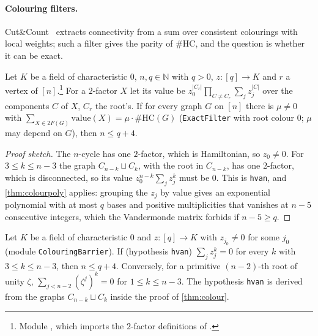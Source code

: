 \documentclass[10pt]{amsart}
\theoremstyle{plain}
\theoremstyle{definition}
\theoremstyle{remark}
\numberwithin{equation}{section}
\newcommand{\N}{\mathbb{N}}
\begin{document}
\paragraph{Colouring filters.} Cut\&Count~\cite{CutAndCount11} extracts connectivity from a sum over
consistent colourings with local weights; such a filter gives the parity of $\#$HC, and the question
is whether it can be exact.

\begin{theorem}\label{thm:colour}
Let $K$ be a field of characteristic $0$, $n,q\in\N$ with $q>0$, $z:[q]\to K$ and $r$ a vertex of
$[n]$.\footnote{Module , which imports the
$2$-factor definitions of .} For a $2$-factor $X$ let its value be
$z_0^{|C_r|}\prod_{C\ne C_r}\sum_jz_j^{|C|}$ over the components $C$ of $X$, $C_r$ the root's. If for
every graph $G$ on $[n]$ there is $\mu\ne0$ with $\sum_{X\in2F(G)}\mathrm{value}(X)=\mu\cdot\#\mathrm{HC}(G)$
(\texttt{ExactFilter} with root colour $0$; $\mu$ may depend on $G$), then $n\le q+4$.
\end{theorem}
\begin{proof}[Proof sketch]
The $n$-cycle has one $2$-factor, which is Hamiltonian, so $z_0\ne0$. For $3\le k\le n-3$ the graph
$C_{n-k}\sqcup C_k$, with the root in $C_{n-k}$, has one $2$-factor, which is disconnected, so its value
$z_0^{n-k}\sum_jz_j^k$ must be $0$. This is \texttt{hvan}, and \cref{thm:colourpoly} applies: grouping
the $z_j$ by value gives an exponential polynomial with at most $q$ bases and positive multiplicities
that vanishes at $n-5$ consecutive integers, which the Vandermonde matrix forbids if $n-5\ge q$.
\end{proof}

\begin{theorem}\label{thm:colourpoly}
Let $K$ be a field of characteristic $0$ and $z:[q]\to K$ with $z_{j_0}\ne0$ for some
$j_0$ (module \texttt{ColouringBarrier}). If (hypothesis
\texttt{hvan}) $\sum_jz_j^k=0$ for every $k$ with $3\le k\le n-3$, then $n\le q+4$. Conversely, for a
primitive $(n-2)$-th root of unity $\zeta$, $\sum_{j<n-2}(\zeta^j)^k=0$ for $1\le k\le n-3$. The hypothesis
\texttt{hvan} is derived from the graphs $C_{n-k}\sqcup C_k$ inside the proof of \cref{thm:colour}.
\end{theorem}
\end{document}
